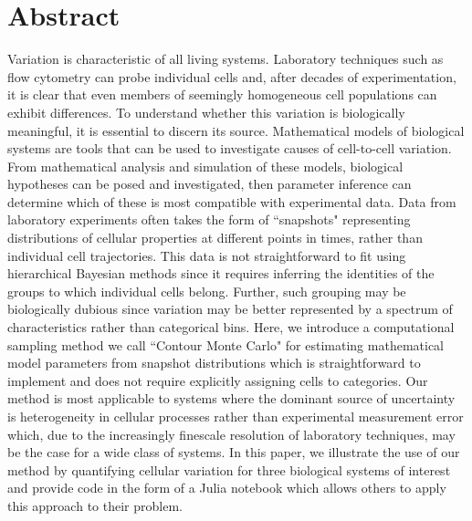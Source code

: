 \documentclass[10pt,letterpaper]{article}
\begin{document}
\newpage
\section{Abstract}
Variation is characteristic of all living systems. Laboratory techniques such as flow cytometry can probe individual cells and, after decades of experimentation, it is clear that even members of seemingly homogeneous cell populations can exhibit differences. To understand whether this variation is biologically meaningful, it is essential to discern its source. Mathematical models of biological systems are tools that can be used to investigate causes of cell-to-cell variation. From mathematical analysis and simulation of these models, biological hypotheses can be posed and investigated, then parameter inference can determine which of these is most compatible with experimental data. Data from laboratory experiments often takes the form of ``snapshots" representing distributions of cellular properties at different points in times, rather than individual cell trajectories. This data is not straightforward to fit using hierarchical Bayesian methods since it requires inferring the identities of the groups to which individual cells belong. Further, such grouping may be biologically dubious since variation may be better represented by a spectrum of characteristics rather than categorical bins. Here, we introduce a computational sampling method we call ``Contour Monte Carlo" for estimating mathematical model parameters from snapshot distributions which is straightforward to implement and does not require explicitly assigning cells to categories. Our method is most applicable to systems where the dominant source of uncertainty is heterogeneity in cellular processes rather than experimental measurement error which, due to the increasingly finescale resolution of laboratory techniques, may be the case for a wide class of systems. In this paper, we illustrate the use of our method by quantifying cellular variation for three biological systems of interest and provide code in the form of a Julia notebook which allows others to apply this approach to their problem.
\end{document}
